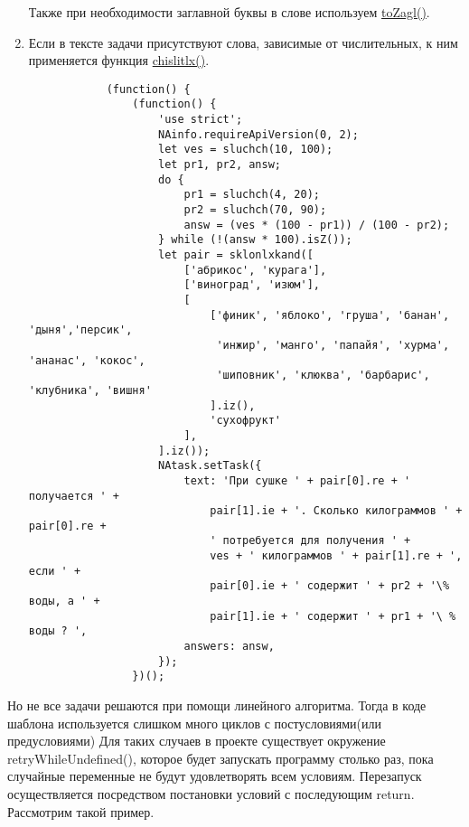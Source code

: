 \begin{enumerate}
          Также при необходимости заглавной буквы в слове используем \hyperlink{toZagl}{toZagl()}.
    \item Если в тексте задачи присутствуют слова, зависимые от числительных, к ним применяется функция \hyperlink{chislitlx}{chislitlx()}.
          \begin{lstlisting}
            (function() {
                (function() {
                    'use strict';
                    NAinfo.requireApiVersion(0, 2);
                    let ves = sluchch(10, 100);
                    let pr1, pr2, answ;
                    do {
                        pr1 = sluchch(4, 20);
                        pr2 = sluchch(70, 90);
                        answ = (ves * (100 - pr1)) / (100 - pr2);
                    } while (!(answ * 100).isZ());
                    let pair = sklonlxkand([
                        ['абрикос', 'курага'],
                        ['виноград', 'изюм'],
                        [
                            ['финик', 'яблоко', 'груша', 'банан', 'дыня','персик',
                             'инжир', 'манго', 'папайя', 'хурма', 'ананас', 'кокос',
                             'шиповник', 'клюква', 'барбарис', 'клубника', 'вишня'
                            ].iz(),
                            'сухофрукт'
                        ],
                    ].iz());
                    NAtask.setTask({
                        text: 'При сушке ' + pair[0].re + ' получается ' +
                            pair[1].ie + '. Сколько килограммов ' + pair[0].re +
                            ' потребуется для получения ' +
                            ves + ' килограммов ' + pair[1].re + ', если ' +
                            pair[0].ie + ' содержит ' + pr2 + '\% воды, а ' +
                            pair[1].ie + ' содержит ' + pr1 + '\ % воды ? ',
                        answers: answ,
                    });
                })();       
         \end{lstlisting}
\end{enumerate}

Но не все задачи решаются при помощи линейного алгоритма. Тогда в коде шаблона
используется слишком много циклов с постусловиями(или предусловиями)
Для таких случаев в проекте существует окружение retryWhileUndefined(), которое
будет запускать программу столько раз, пока случайные переменные не будут удовлетворять всем условиям.
Перезапуск осуществляется посредством постановки условий с последующим return.
Рассмотрим такой пример.

